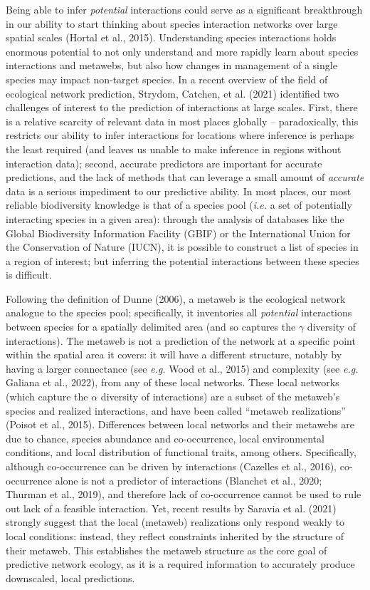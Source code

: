 \documentclass[10pt,oneside]{article}
\begin{document}
Being able to infer \emph{potential} interactions could serve as a
significant breakthrough in our ability to start thinking about species
interaction networks over large spatial scales (Hortal et al., 2015).
Understanding species interactions holds enormous potential to not only
understand and more rapidly learn about species interactions and
metawebs, but also how changes in management of a single species may
impact non-target species. In a recent overview of the field of
ecological network prediction, Strydom, Catchen, et al. (2021)
identified two challenges of interest to the prediction of interactions
at large scales. First, there is a relative scarcity of relevant data in
most places globally -- paradoxically, this restricts our ability to
infer interactions for locations where inference is perhaps the least
required (and leaves us unable to make inference in regions without
interaction data); second, accurate predictors are important for
accurate predictions, and the lack of methods that can leverage a small
amount of \emph{accurate} data is a serious impediment to our predictive
ability. In most places, our most reliable biodiversity knowledge is
that of a species pool (\emph{i.e.} a set of potentially interacting
species in a given area): through the analysis of databases like the
Global Biodiversity Information Facility (GBIF) or the International
Union for the Conservation of Nature (IUCN), it is possible to construct
a list of species in a region of interest; but inferring the potential
interactions between these species is difficult.

Following the definition of Dunne (2006), a metaweb is the ecological
network analogue to the species pool; specifically, it inventories all
\emph{potential} interactions between species for a spatially delimited
area (and so captures the \(\gamma\) diversity of interactions). The
metaweb is not a prediction of the network at a specific point within
the spatial area it covers: it will have a different structure, notably
by having a larger connectance (see \emph{e.g.} Wood et al., 2015) and
complexity (see \emph{e.g.} Galiana et al., 2022), from any of these
local networks. These local networks (which capture the \(\alpha\)
diversity of interactions) are a subset of the metaweb's species and
realized interactions, and have been called ``metaweb realizations''
(Poisot et al., 2015). Differences between local networks and their
metawebs are due to chance, species abundance and co-occurrence, local
environmental conditions, and local distribution of functional traits,
among others. Specifically, although co-occurrence can be driven by
interactions (Cazelles et al., 2016), co-occurrence alone is not a
predictor of interactions (Blanchet et al., 2020; Thurman et al., 2019),
and therefore lack of co-occurrence cannot be used to rule out lack of a
feasible interaction. Yet, recent results by Saravia et al. (2021)
strongly suggest that the local (metaweb) realizations only respond
weakly to local conditions: instead, they reflect constraints inherited
by the structure of their metaweb. This establishes the metaweb
structure as the core goal of predictive network ecology, as it is a
required information to accurately produce downscaled, local
predictions.
\end{document}
